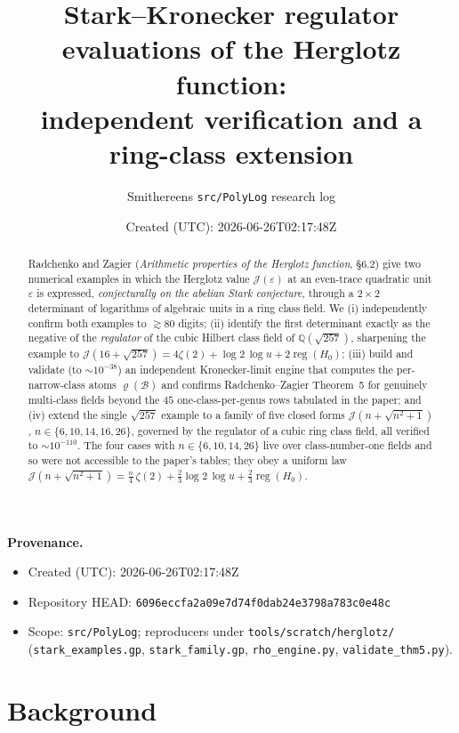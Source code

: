 \documentclass[11pt]{article}
\title{Stark--Kronecker regulator evaluations of the Herglotz function:\\
independent verification and a ring-class extension}
\author{Smithereens \texttt{src/PolyLog} research log}
\date{Created (UTC): 2026-06-26T02:17:48Z}
\newcommand{\Jc}{\mathcal{J}}
\newcommand{\reg}{\operatorname{reg}}
\newcommand{\Q}{\mathbb{Q}}
\newcommand{\rhoB}{\varrho}
\begin{document}
\maketitle

\noindent\textbf{Provenance.}
\begin{itemize}\itemsep0pt
  \item Created (UTC): 2026-06-26T02:17:48Z
  \item Repository HEAD: \texttt{6096eccfa2a09e7d74f0dab24e3798a783c0e48c}
  \item Scope: \texttt{src/PolyLog}; reproducers under
        \texttt{tools/scratch/herglotz/} (\texttt{stark\_examples.gp},
        \texttt{stark\_family.gp}, \texttt{rho\_engine.py},
        \texttt{validate\_thm5.py}).
\end{itemize}

\begin{abstract}
Radchenko and Zagier (\emph{Arithmetic properties of the Herglotz function},
\S6.2) give two numerical examples in which the Herglotz value
$\Jc(\varepsilon)$ at an even-trace quadratic unit $\varepsilon$ is expressed,
\emph{conjecturally on the abelian Stark conjecture}, through a $2\times2$
determinant of logarithms of algebraic units in a ring class field. We
(i) independently confirm both examples to $\gtrsim 80$ digits;
(ii) identify the first determinant exactly as the negative of the
\emph{regulator} of the cubic Hilbert class field of $\Q(\sqrt{257})$,
sharpening the example to
$\Jc(16+\sqrt{257})=4\zeta(2)+\log2\,\log u+2\reg(H_0)$;
(iii) build and validate (to $\sim10^{-38}$) an independent Kronecker-limit
engine that computes the per-narrow-class atoms $\rhoB(\mathcal B)$ and confirms
Radchenko--Zagier Theorem~5 for genuinely multi-class fields beyond the $45$
one-class-per-genus rows tabulated in the paper; and
(iv) extend the single $\sqrt{257}$ example to a family of five closed forms
$\Jc(n+\sqrt{n^2+1})$, $n\in\{6,10,14,16,26\}$, governed by the regulator of a
cubic ring class field, all verified to $\sim10^{-110}$. The four cases with
$n\in\{6,10,14,26\}$ live over class-number-one fields and so were not
accessible to the paper's tables; they obey a uniform law
$\Jc(n+\sqrt{n^2+1})=\tfrac n4\,\zeta(2)+\tfrac23\log2\,\log u+\tfrac23\reg(H_0)$.
\end{abstract}

\section{Background}
\end{document}
